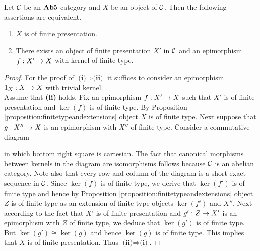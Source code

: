 \begin{proposition}\label{proposition:finitelypresentedinab5}
Let ${\mathcal C}$ be an $\mathbf{Ab}5$-category and $X$ be an object of ${\mathcal C}$. Then the following assertions are equivalent.
\begin{enumerate}[label=\emph{\textbf{(\roman*)}}, leftmargin=3.0em]
\item $X$ is of finite presentation.
\item There exists an object of finite presentation $X'$ in ${\mathcal C}$ and an epimorphism $f:X'\rightarrow X$ with kernel of finite type.
\end{enumerate} 
\end{proposition}
\begin{proof}
For the proof of $\textbf{(i)}\Rightarrow\textbf{(ii)}$ it suffices to consider an epimorphism $1_X:X\rightarrow X$ with trivial kernel.\\
Assume that \textbf{(ii)} holds. Fix an epimorphism $f:X'\rightarrow X$ such that $X'$ is of finite presentation and $\ker(f)$ is of finite type. By Proposition \ref{proposition:finitetypeandextensions} object $X$ is of finite type. Next suppose that $g:X''\rightarrow X$ is an epimorphism with $X''$ of finite type. Consider a commutative diagram
\begin{center}
\end{center}
in which bottom right square is cartesian. The fact that canonical morphisms between kernels in the diagram are isomorphisms follows because ${\mathcal C}$ is an abelian category. Note also that every row and column of the diagram is a short exact sequence in ${\mathcal C}$. Since $\ker(f)$ is of finite type, we derive that $\ker(f')$ is of finite type and hence by Proposition \ref{proposition:finitetypeandextensions} object $Z$ is of finite type as an extension of finite type objects $\ker(f')$ and $X''$. Next according to the fact that $X'$ is of finite presentation and $g':Z\rightarrow X'$ is an epimorphism with $Z$ of finite type, we deduce that $\ker(g')$ is of finite type. But $\ker(g')\cong \ker(g)$ and hence $\ker(g)$ is of finite type. This implies that $X$ is of finite presentation. Thus $\textbf{(ii)}\Rightarrow\textbf{(i)}$.
\end{proof}


